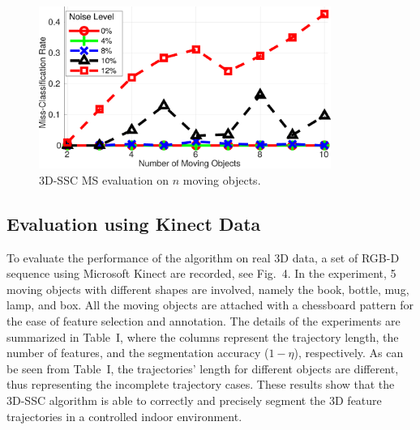 \documentclass[10pt,twocolumn,letterpaper]{article}  %
\begin{document}
\begin{flushleft}
\begin{figure}[thpb]
		\includegraphics[width=0.85\textwidth]{image/MissClassification_nObjs_modified2.eps}      
   \caption{3D-SSC MS evaluation on $\textit{n}$ moving objects.}
   \label{fig:nObjs_noise}
   \vspace*{-0.3cm}
\end{figure}
\end{flushleft}
   \vspace*{-0.3cm}

\subsection{Evaluation using Kinect Data}
To evaluate the performance of the algorithm on real 3D data, a set of RGB-D sequence using Microsoft Kinect are recorded, see Fig.~4. In the experiment, 5 moving objects with different shapes are involved, namely the book, bottle, mug, lamp, and box. All the moving objects are attached with a chessboard pattern for the ease of feature selection and annotation. The details of the experiments are summarized in Table~I, where the columns represent the trajectory length, the number of features, and the segmentation accuracy ($1-\eta$), respectively. As can be seen from Table~I, the trajectories' length for different objects are different, thus representing the incomplete trajectory cases. These results show that the 3D-SSC algorithm is able to correctly and precisely segment the 3D feature trajectories in a controlled indoor environment.
\end{document}
